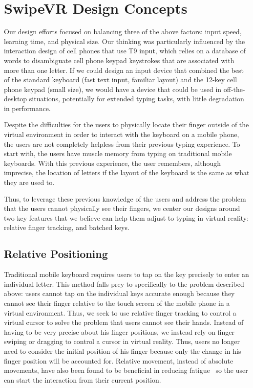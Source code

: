 \section{SwipeVR  Design Concepts}


Our design efforts focused on balancing three of the above factors: input speed, learning time, and physical size.
Our thinking was particularly influenced by the interaction design of cell phones that use T9 input, which relies on a database of words to disambiguate cell phone keypad keystrokes that are associated with more than one letter.
If we could design an input device that combined the best of the standard keyboard (fast text input, familiar layout) and the 12-key cell phone keypad (small size), we would have a device that could be used in off-the-desktop situations, potentially for extended typing tasks, with little degradation in performance. 

Despite the difficulties for the users to physically locate their finger outside of the virtual environment in order to interact with the keyboard on a mobile phone, the users are not completely helpless from their previous typing experience.
To start with, the users have muscle memory from typing on traditional mobile keyboards. With this previous experience, the user remembers, although imprecise, the location of letters if the layout of the keyboard is the same as what they are used to.

Thus, to leverage these previous knowledge of the users and address the problem that the users cannot physically see their fingers, we center our designs around two key features that we believe can help them adjust to typing in virtual reality: relative finger tracking, and batched keys.

\subsection{Relative Positioning}
Traditional mobile keyboard requires users to tap on the key precisely to enter an individual letter.
This method falls prey to specifically to the problem described above: users cannot tap on the individual keys accurate enough because they cannot see their finger relative to the touch screen of the mobile phone in a virtual environment.
Thus, we seek to use relative finger tracking to control a virtual cursor to solve the problem that users cannot see their hands.
Instead of having to be very precise about his finger positions, we instead rely on finger swiping or dragging to control a cursor in virtual reality.
Thus, users no longer need to consider the initial position of his finger because only the change in his finger position will be accounted for. 
Relative movement, instead of absolute movements, have also been found to be beneficial in reducing fatigue~\cite{Hincapie-Ramos:2014:CEM:2556288.2557130} so the user can start the interaction from their current position.

